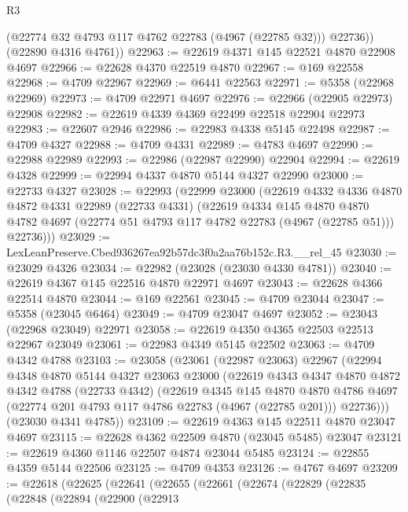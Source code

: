\begin{lexlean}{R3}
\begin{coremodule}
          (@22774 @32 @4793 @117 @4762 @22783 (@4967 (@22785 @32)))
          @22736))
      (@22890 @4316 @4761))
@22963 := @22619 @4371 @145 @22521 @4870 @22908 @4697
@22966 := @22628 @4370 @22519 @4870
@22967 := @169 @22558
@22968 := @4709 @22967
@22969 := @6441 @22563
@22971 := @5358 (@22968 @22969)
@22973 := @4709 @22971 @4697
@22976 := @22966 (@22905 @22973) @22908
@22982 := @22619 @4339 @4369 @22499 @22518 @22904 @22973
@22983 := @22607 @2946
@22986 := @22983 @4338 @5145 @22498
@22987 := @4709 @4327
@22988 := @4709 @4331
@22989 := @4783 @4697
@22990 := @22988 @22989
@22993 := @22986 (@22987 @22990) @22904
@22994 := @22619 @4328
@22999 := @22994 @4337 @4870 @5144 @4327 @22990
@23000 := @22733 @4327
@23028 := @22993
    (@22999
      @23000
      (@22619
        @4332
        @4336
        @4870
        @4872
        @4331
        @22989
        (@22733 @4331)
        (@22619
          @4334
          @145
          @4870
          @4870
          @4782
          @4697
          (@22774 @51 @4793 @117 @4782 @22783 (@4967 (@22785 @51)))
          @22736)))
@23029 := LexLeanPreserve.Cbed936267ea92b57dc3f0a2aa76b152c.R3.__rel_45
@23030 := @23029 @4326
@23034 := @22982 (@23028 (@23030 @4330 @4781))
@23040 := @22619 @4367 @145 @22516 @4870 @22971 @4697
@23043 := @22628 @4366 @22514 @4870
@23044 := @169 @22561
@23045 := @4709 @23044
@23047 := @5358 (@23045 @6464)
@23049 := @4709 @23047 @4697
@23052 := @23043 (@22968 @23049) @22971
@23058 := @22619 @4350 @4365 @22503 @22513 @22967 @23049
@23061 := @22983 @4349 @5145 @22502
@23063 := @4709 @4342 @4788
@23103 := @23058
    (@23061
      (@22987 @23063)
      @22967
      (@22994
        @4348
        @4870
        @5144
        @4327
        @23063
        @23000
        (@22619
          @4343
          @4347
          @4870
          @4872
          @4342
          @4788
          (@22733 @4342)
          (@22619
            @4345
            @145
            @4870
            @4870
            @4786
            @4697
            (@22774 @201 @4793 @117 @4786 @22783 (@4967 (@22785 @201)))
            @22736)))
      (@23030 @4341 @4785))
@23109 := @22619 @4363 @145 @22511 @4870 @23047 @4697
@23115 := @22628 @4362 @22509 @4870 (@23045 @5485) @23047
@23121 := @22619 @4360 @1146 @22507 @4874 @23044 @5485
@23124 := @22855 @4359 @5144 @22506
@23125 := @4709 @4353
@23126 := @4767 @4697
@23209 := @22618
    (@22625
      (@22641
        (@22655
          (@22661
            (@22674
              (@22829
                (@22835
                  (@22848
                    (@22894
                      (@22900
                        (@22913

\end{coremodule}
\end{lexlean}
